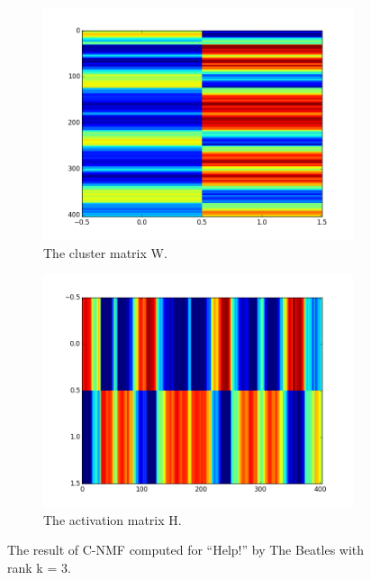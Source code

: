 \begin{figure}
        \centering
        \begin{subfigure}[b]{0.47\textwidth}
                \includegraphics[width=\textwidth]{Figures/F}
                \caption{The cluster matrix W.}
                \label{fig:Wmatrix}
        \end{subfigure}%
        \begin{subfigure}[b]{0.47\textwidth}
                \includegraphics[width=\textwidth]{Figures/G}
                \caption{The activation matrix H.}
                \label{fig:Hmatrix}
        \end{subfigure}
          \caption{The result of C-NMF computed for ``Help!'' by The Beatles with rank k = 3.}
        \label{fig:CNMFbeatles}
\end{figure}
 

